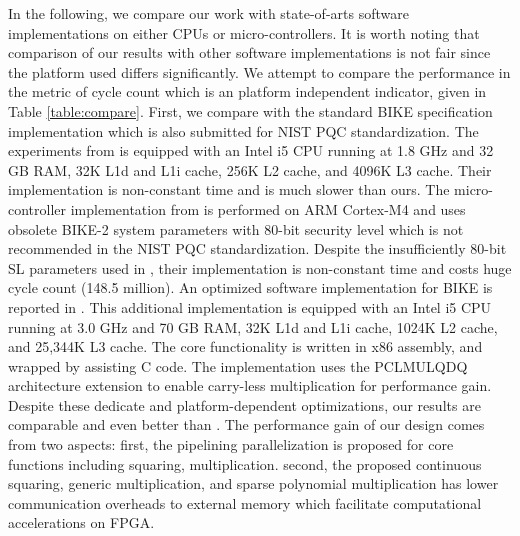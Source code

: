 \documentclass[runningheads]{llncs}
\begin{document}
In the following, we compare our work with state-of-arts software implementations on either CPUs or micro-controllers. It is worth noting that comparison of our results with other software implementations is not fair since the platform used differs significantly. We attempt to compare the performance in the metric of cycle count which is an platform independent indicator, given in Table \ref{table:compare}.
First, we compare with the standard BIKE specification implementation \cite{aragon2017bike} which is also submitted for NIST PQC standardization. The experiments from \cite{von2014lightweight} is equipped with an Intel i5 CPU running at 1.8 GHz and 32 GB RAM, 32K L1d and L1i cache, 256K L2 cache, and 4096K L3 cache. Their implementation is non-constant time and is much slower than ours. The micro-controller implementation from \cite{maurich2015implementing} is performed on ARM Cortex-M4 and uses obsolete BIKE-2 system parameters with 80-bit security level which is not recommended in the NIST PQC standardization. Despite the insufficiently 80-bit SL parameters used in \cite{maurich2015implementing}, their implementation is non-constant time and costs huge cycle count (148.5 million).  An optimized software implementation for BIKE is reported in \cite{drucker2017toolbox}. This additional implementation is equipped with an Intel i5 CPU running at 3.0 GHz and 70 GB RAM, 32K L1d and L1i cache, 1024K L2 cache, and 25,344K L3 cache. The core functionality is written in x86 assembly, and wrapped by assisting C code.
The implementation uses the PCLMULQDQ architecture extension to enable carry-less multiplication for performance gain. Despite these dedicate and platform-dependent optimizations, our results are comparable and even better than \cite{drucker2017toolbox}. The performance gain of our design comes from two aspects: first, the pipelining parallelization is proposed for core functions including squaring, multiplication. second, the proposed continuous squaring, generic multiplication, and sparse polynomial multiplication has lower communication overheads to external memory which facilitate computational accelerations on FPGA.
\end{document}
